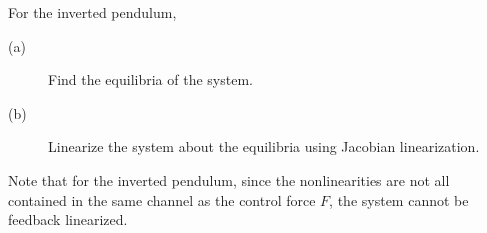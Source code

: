 For the inverted pendulum,
    \begin{description}
    \item[(a)] Find the equilibria of the system.
    \item[(b)] Linearize the system about the equilibria using Jacobian linearization.
    \end{description}
Note that for the inverted pendulum, since the nonlinearities are not all contained in the same channel as the control force $F$, the system cannot be feedback linearized.
